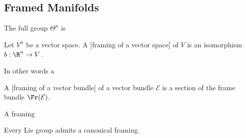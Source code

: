 \subsection{Framed Manifolds}\label{sec:framed-manifolds}

The full group $\Theta^n$ is 

\begin{definition}
	Let $V^n$ be a vector space. A [framing of a vector space] of $V$ is an isomorphism $b : \R^n \to V$.
\end{definition}

In other words a 

\begin{definition}
	A [framing of a vector bundle] of a vector bundle $\mathcal{E}$ is a section of the frame bundle $\Fr(\mathcal{E})$.
\end{definition}

A framing 

\begin{example}
	Every Lie group admits a canonical framing.


\end{example}
